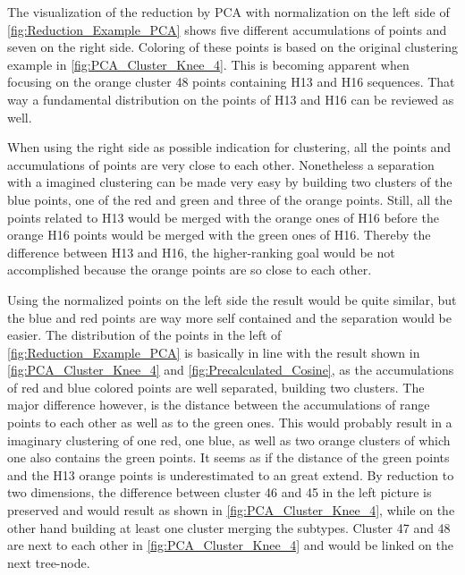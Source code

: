 The visualization of the reduction by \gls{PCA} with normalization on the left side of \autoref{fig:Reduction_Example_PCA} shows five different accumulations of points and seven on the right side. Coloring of these points is based on the original clustering example in \autoref{fig:PCA_Cluster_Knee_4}. This is becoming apparent when focusing on the orange cluster 48 points containing H13 and H16 sequences. That way a fundamental distribution on the points of H13 and H16 can be reviewed as well. 

When using the right side as possible indication for clustering, all the points and accumulations of points are very close to each other. Nonetheless a separation with a imagined clustering can be made very easy by building two clusters of the blue points, one of the red and green and three of the orange points. Still, all the points related to H13 would be merged with the orange ones of H16 before the orange H16 points would be merged with the green ones of H16. Thereby the difference between H13 and H16, the higher-ranking goal would be not accomplished because the orange points are so close to each other. 

Using the normalized points on the left side the result would be quite similar, but the blue and red points are way more self contained and the separation would be easier. The distribution of the points in the left of \autoref{fig:Reduction_Example_PCA} is basically in line with the result shown in \autoref{fig:PCA_Cluster_Knee_4} and \autoref{fig:Precalculated_Cosine}, as the accumulations of red and blue colored points are well separated, building two clusters. The major difference however, is the distance between the accumulations of range points to each other as well as to the green ones. This would probably result in a imaginary clustering of one red, one blue, as well as two orange clusters of which one also contains the green points. It seems as if the distance of the green points and the H13 orange points is underestimated to an great extend. By reduction to two dimensions, the difference between cluster 46 and 45 in the left picture is preserved and would result as shown in \autoref{fig:PCA_Cluster_Knee_4}, while on the other hand building at least one cluster merging the subtypes. Cluster 47 and 48 are next to each other in \autoref{fig:PCA_Cluster_Knee_4} and would be linked on the next tree-node.

